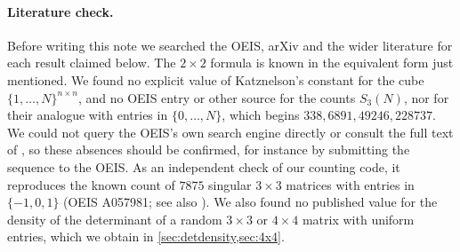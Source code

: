 \documentclass[11pt]{article}
\theoremstyle{definition}
\begin{document}
\paragraph{Literature check.} Before writing this note we searched the OEIS, arXiv and the wider literature for each result claimed below. The $2\times2$ formula is known in the equivalent form just mentioned. We found no explicit value of Katznelson's constant for the cube $\{1,\dots,N\}^{n\times n}$, and no OEIS entry or other source for the counts $S_3(N)$, nor for their analogue with entries in $\{0,\dots,N\}$, which begins $338, 6891, 49246, 228737$. We could not query the OEIS's own search engine directly or consult the full text of \cite{Katznelson}, so these absences should be confirmed, for instance by submitting the sequence to the OEIS. As an independent check of our counting code, it reproduces the known count of $7875$ singular $3\times3$ matrices with entries in $\{-1,0,1\}$ (OEIS A057981; see also \cite{MathWorld}). We also found no published value for the density of the determinant of a random $3\times3$ or $4\times4$ matrix with uniform entries, which we obtain in \cref{sec:detdensity,sec:4x4}.
\end{document}
